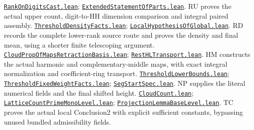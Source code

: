 \documentclass[11pt,a4paper]{article}
\numberwithin{equation}{section}
\theoremstyle{remark}\newtheorem{remark}[theorem]{Remark}
\newcommand{\src}[2]{\href{https://github.com/CocoSgt/riemann-hypothesis-lean/blob/7cbf7a0c32fca1badf05931879a37c3f8a2b03b4/src/#1}{\texttt{#2}}}
\begin{document}
\begin{thebibliography}{99}
 \src{Formalism/SharpRestriction/GrowthBounds/BinomialRatio/RankOnDigitsCast.lean}{RankOnDigitsCast.lean}; \src{Formalism/SharpRestriction/GrowthBounds/BinomialRatio/ExtendedStatementOfParts.lean}{ExtendedStatementOfParts.lean}. RU proves the actual upper count, digit-to-HH dimension comparison and integral paired assembly.
 \src{Formalism/SharpRestriction/GrowthBounds/ColumnSpanDensity/ThresholdDensityFacts.lean}{ThresholdDensityFacts.lean}; \src{Formalism/SharpRestriction/GrowthBounds/ColumnSpanDensity/LocalHypothesisOfGlobal.lean}{LocalHypothesisOfGlobal.lean}. RD records the complete lower-rank source route and proves the density and final mean, using a shorter finite telescoping argument.
 \src{Formalism/SharpRestriction/GrowthBounds/ColumnSpanDensity/CloudPropOfMapsRetractionBasis.lean}{CloudPropOfMapsRetractionBasis.lean}; \src{Formalism/SharpRestriction/GrowthBounds/ColumnSpanDensity/RestHLTransport.lean}{RestHLTransport.lean}. HM constructs the actual harmonic and complementary-middle maps, with exact integral normalization and coefficient-ring transport.
 \src{Formalism/SharpRestriction/GrowthBounds/BinomialRatio/ThresholdLowerBounds.lean}{ThresholdLowerBounds.lean}; \src{Formalism/SharpRestriction/GrowthBounds/ColumnSpanDensity/ThresholdFixedWeightFacts.lean}{ThresholdFixedWeightFacts.lean}; \src{Formalism/SharpRestriction/GrowthBounds/ColumnSpanDensity/SegStartSpec.lean}{SegStartSpec.lean}. NP supplies the literal numerical fields and the final shifted height.
 \src{Formalism/SharpRestriction/GrowthBounds/ColumnSpanDensity/CloudCount.lean}{CloudCount.lean}; \src{Formalism/SharpRestriction/GrowthBounds/ColumnSpanDensity/LatticeCountPrimeMonoLevel.lean}{LatticeCountPrimeMonoLevel.lean}; \src{Formalism/SharpRestriction/GrowthBounds/ProjectionLemmaBaseLevel.lean}{ProjectionLemmaBaseLevel.lean}. TC proves the actual local Conclusion2 with explicit sufficient constants, bypassing unused bundled admissibility fields.



\end{thebibliography}
\end{document}
